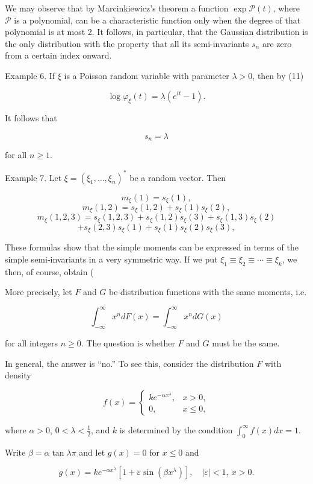 {We may observe that by Marcinkiewicz’s theorem a function $\exp \mathcal{P}(t)$, where $\mathcal{P}$ is a polynomial, can be a characteristic function only when the degree of that polynomial is at most 2. It follows, in particular, that the Gaussian distribution is the only distribution with the property that all its semi-invariants $s_n$ are zero from a certain index onward.

Example 6. If $\xi$ is a Poisson random variable with parameter $\lambda > 0$, then by (11)

$$\log \varphi_\xi(t) = \lambda(e^{it} - 1).$$

It follows that

$$s_n = \lambda$$

for all $n \geq 1$.

Example 7. Let $\xi = (\xi_1, \ldots, \xi_n)^*$ be a random vector. Then

$$m_\xi(1) = s_\xi(1),$$
$$m_\xi(1, 2) = s_\xi(1, 2) + s_\xi(1)s_\xi(2),$$
$$m_\xi(1, 2, 3) = s_\xi(1, 2, 3) + s_\xi(1, 2)s_\xi(3) + s_\xi(1, 3)s_\xi(2)$$
$$+ s_\xi(2, 3)s_\xi(1) + s_\xi(1)s_\xi(2)s_\xi(3),$$

These formulas show that the simple moments can be expressed in terms of the simple semi-invariants in a very symmetric way. If we put $\xi_1 \equiv \xi_2 \equiv \cdots \equiv \xi_k$, we then, of course, obtain (

More precisely, let $F$ and $G$ be distribution functions with the same moments, i.e.

$$\int_{-\infty}^{\infty} x^n dF(x) = \int_{-\infty}^{\infty} x^n dG(x)$$

for all integers $n \geq 0$. The question is whether $F$ and $G$ must be the same.

In general, the answer is “no.” To see this, consider the distribution $F$ with density

$$f(x) = \begin{cases} ke^{-\alpha x^\lambda}, & x > 0, \\ 0, & x \leq 0, \end{cases}$$

where $\alpha > 0$, $0 < \lambda < \frac{1}{2}$, and $k$ is determined by the condition $\int_{0}^{\infty} f(x) dx = 1$.

Write $\beta = \alpha \tan \lambda \pi$ and let $g(x) = 0$ for $x \leq 0$ and

$$g(x) = ke^{-\alpha x^\lambda} [1 + \varepsilon \sin(\beta x^\lambda)], \quad |\varepsilon| < 1, \ x > 0.$$

}
